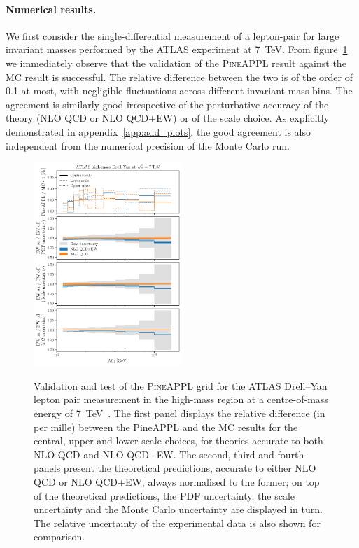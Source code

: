 \paragraph{Numerical results.}
We first consider the single-differential measurement of a lepton-pair
for large invariant masses performed by the ATLAS experiment at \SI{7}{\tera\electronvolt}.
From figure~\ref{fig:atlaszhighmass49fb} we immediately
observe that the validation of the \textsc{PineAPPL} result against the MC
result is successful. The relative difference between the two is of the order of
\SI{0.1}{\permille} at most, with negligible fluctuations across different
invariant mass bins. The agreement is similarly good irrespective of the
perturbative accuracy of the theory (NLO QCD or NLO QCD+EW) or of the scale
choice. As explicitly demonstrated in appendix~\ref{app:add_plots}, the good
agreement is also independent from the numerical precision of the Monte Carlo
run.

\begin{figure}[!t]
    \centering
    \includegraphics[width=0.5\textwidth]{figures/pineappl_ATLASZHIGHMASS49FB}\\
    \caption{Validation and test of the \textsc{PineAPPL} grid for the ATLAS
      Drell--Yan lepton pair measurement in the high-mass region at
      a centre-of-mass energy of \SI{7}{\tera\electronvolt}~\cite{Aad:2013iua}. The first panel
      displays the relative difference (in per mille) between the {\sc PineAPPL}
      and the MC results for the central, upper and lower scale choices,
      for theories accurate to both NLO QCD and NLO QCD+EW\@. The second, third
      and fourth panels present the theoretical predictions, accurate to either
      NLO QCD or NLO QCD+EW, always normalised to the former; on top of the
      theoretical predictions, the PDF uncertainty, the scale uncertainty and
      the Monte Carlo uncertainty are displayed in turn. The relative
      uncertainty of the experimental data is also shown for comparison.}
    \label{fig:atlaszhighmass49fb}
\end{figure}

